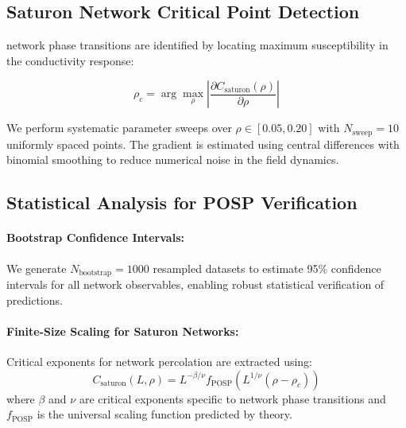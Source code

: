 \subsection{Saturon Network Critical Point Detection}

\saturon{} network phase transitions are identified by locating maximum 
susceptibility in the conductivity response:

\begin{equation}
\rho_c = \arg\max_{\rho} \left|\frac{\partial C_{\text{saturon}}(\rho)}{\partial \rho}\right|
\label{eq:saturon_critical}
\end{equation}

We perform systematic parameter sweeps over $\rho \in [0.05, 0.20]$ with 
$N_{\text{sweep}}=10$ uniformly spaced points. The gradient is estimated 
using central differences with binomial smoothing to reduce numerical noise 
in the \saturon{} field dynamics.

\subsection{Statistical Analysis for POSP Verification}

\paragraph{Bootstrap Confidence Intervals:}
We generate $N_{\text{bootstrap}}=1000$ resampled datasets to estimate 95\% 
confidence intervals for all \saturon{} network observables, enabling robust 
statistical verification of \posp{} predictions.

\paragraph{Finite-Size Scaling for Saturon Networks:}
Critical exponents for \saturon{} network percolation are extracted using:
\begin{equation}
C_{\text{saturon}}(L, \rho) = L^{-\beta/\nu} f_{\text{POSP}}\left(L^{1/\nu}(\rho - \rho_c)\right)
\label{eq:saturon_fss}
\end{equation}
where $\beta$ and $\nu$ are critical exponents specific to \saturon{} network 
phase transitions and $f_{\text{POSP}}$ is the universal scaling function 
predicted by \posp{} theory.

